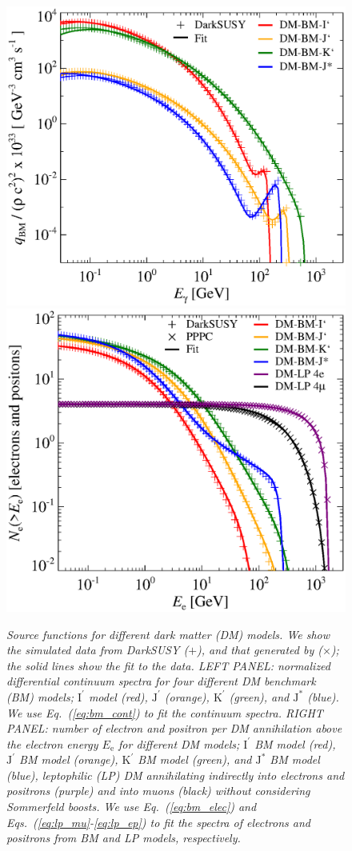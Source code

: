 \documentclass[10pt,aps,pra,reprint,amsmath,amsfonts,amssymb,showpacs,nofootinbib,floatfix]{revtex4-1}
\newcommand{\rmn}{\mathrm}
\newcommand{\ee}{E_\rmn{e}}
\newcommand{\Kp}{\rmn{K}^\prime}
\newcommand{\Ip}{\rmn{I}^\prime}
\newcommand{\Js}{\rmn{J}^*}
\newcommand{\Jp}{\rmn{J}^\prime}
\begin{document}
\begin{figure}
\begin{minipage}{2.0\columnwidth}
 \includegraphics[width=0.49\columnwidth]{figures/fit.ds.flux.eps}
 \includegraphics[width=0.49\columnwidth]{figures/fit.epflux.int.eps}
 \caption{\it Source functions for different dark matter (DM)
   models. We show the simulated data from {\sc DarkSUSY} \cite{ds}
   ($+$), and that generated by
   \protect\cite{2011JCAP...03..019C,2011JCAP...03..051C} ($\times$);
   the solid lines show the fit to the data. LEFT PANEL: normalized
   differential continuum spectra for four different DM benchmark (BM)
   models; $\Ip$ model (red), $\Jp$ (orange), $\Kp$ (green), and $\Js$
   (blue). We use Eq.~(\ref{eq:bm_cont}) to fit the continuum
   spectra. RIGHT PANEL: number of electron and positron per DM
   annihilation above the electron energy $\ee$ for different DM
   models; $\Ip$ BM model (red), $\Jp$ BM model (orange), $\Kp$ BM
   model (green), and $\Js$ BM model (blue), leptophilic (LP) DM
     annihilating indirectly into electrons and positrons (purple) and
     into muons (black) without considering Sommerfeld boosts. We use
   Eq.~(\ref{eq:bm_elec}) and Eqs.~(\ref{eq:lp_mu}-\ref{eq:lp_ep}) to
   fit the spectra of electrons and positrons from BM and LP models,
   respectively.}
 \label{fig:q_DM}
\end{minipage}
\end{figure}
\end{document}
